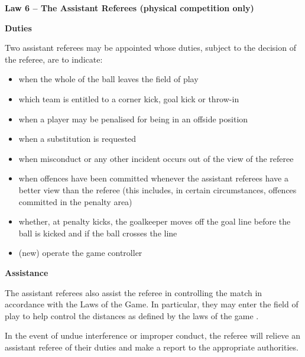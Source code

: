 \clearpage
\sffamily
{\bfseries\color[rgb]{0.4,0.4,0.4}
Law 6 -- The Assistant Referees (physical competition only)}
{}


\bigskip

{\bfseries Duties}

\headlinebox

Two assistant referees may be appointed whose duties, subject to the decision of the referee, are to indicate:

\begin{itemize}
\item when the whole of the ball leaves the field of play
\item which team is entitled to a corner kick, goal kick or throw-in
\item when a player may be penalised for being in an offside position
\item when a substitution is requested
\item when misconduct or any other incident occurs out of the view of the referee
\item when offences have been committed whenever the assistant referees have a better view than the referee (this includes, in certain circumstances, offences committed in the penalty area)
\item whether, at penalty kicks, the goalkeeper moves off the goal line before the ball is kicked and if the ball crosses the line
\item (new) operate the game controller
\end{itemize}

{\bfseries Assistance}

\headlinebox

The assistant referees also assist the referee in controlling the match in accordance with the Laws of the Game. In particular, they may enter the field of play to help control the distances as defined by the laws of the game
.

\bigskip

In the event of undue interference or improper conduct, the referee will relieve an assistant referee of their duties and make a report to the appropriate authorities.